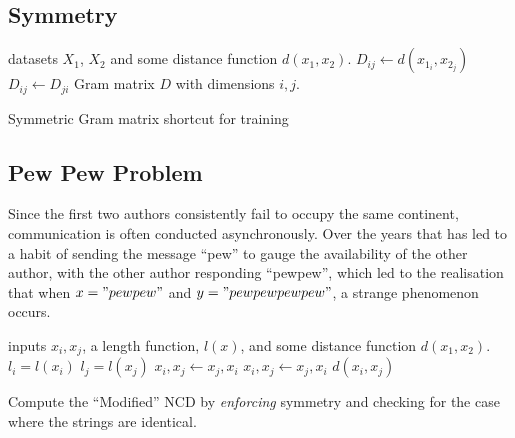 \documentclass[conference]{IEEEtran}
\begin{document}
\subsection{Symmetry}

\begin{algorithm}
    \begin{algorithmic}
        \Require datasets $X_1$, $X_2$ and some distance function $d(x_1,x_2)$.
             
                \State $D_{ij} \gets d(x_{1_i},x_{2_j})$
                \State $D_{ij} \gets D_{ji}$ 
            \EndFor
        \EndFor
        \State \Return Gram matrix $D$ with dimensions $i,j$.
    \end{algorithmic}
    \caption{Symmetric Gram matrix shortcut for training}
    \label{alg:symmetric}
\end{algorithm}

\subsection{Pew Pew Problem}
Since the first two authors consistently fail to occupy the same continent, communication is often conducted asynchronously. 
Over the years that has led to a habit of sending the message ``pew'' to gauge the availability of the other author, with the other author responding ``pewpew'', which led to the realisation that when $x = "pewpew"$ and $y="pewpewpewpew"$, a strange phenomenon occurs.


\begin{algorithm}
    \begin{algorithmic}
        \Require inputs $x_i, x_j$, a length function, $l(x)$, and some distance function $d(x_1,x_2)$.
         
            \State {}
        \Else  {}
            \State $l_i = l(x_i)$
            \State $l_j = l(x_j)$
                 \State $x_i, x_j \gets x_j, x_i$ 
                 
                     \State $x_i, x_j \gets x_j, x_i$ 
                \EndIf
            \EndIf
            \State \Return $d(x_i, x_j)$
        \EndIf
    \end{algorithmic}
    \caption{Compute the ``Modified'' NCD by \textit{enforcing} symmetry and checking for the case where the strings are identical.}
    \label{alg:modified}
\end{algorithm}
\end{document}
